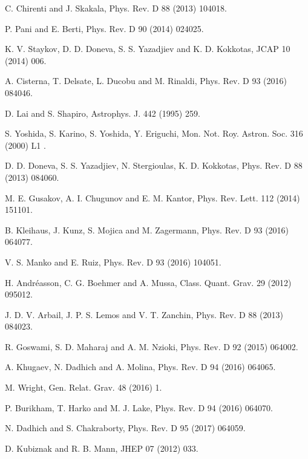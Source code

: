 \documentclass[aps]{revtex4}
\begin{document}
\begin{thebibliography}{999}
 C. Chirenti and J. Skakala, Phys. Rev. D 88 (2013) 104018.

 P. Pani and E. Berti, Phys. Rev. D 90 (2014) 024025.

 K. V. Staykov, D. D. Doneva, S. S. Yazadjiev and K. D.
Kokkotas, JCAP 10 (2014) 006.

 A. Cisterna, T. Delsate, L. Ducobu and M. Rinaldi, Phys.
Rev. D 93 (2016) 084046.

 D. Lai and S. Shapiro, Astrophys. J. 442 (1995) 259.

 S. Yoshida, S. Karino, S. Yoshida, Y. Eriguchi, Mon. Not.
Roy. Astron. Soc. 316 (2000) L1 .

 D. D. Doneva, S. S. Yazadjiev, N. Stergioulas, K. D.
Kokkotas, Phys. Rev. D 88 (2013) 084060.

 M. E. Gusakov, A. I. Chugunov and E. M. Kantor, Phys. Rev.
Lett. 112 (2014) 151101.

 B. Kleihaus, J. Kunz, S. Mojica and M. Zagermann, Phys.
Rev. D 93 (2016) 064077.

 V. S. Manko and E. Ruiz, Phys. Rev. D 93 (2016) 104051.

 H. Andr\'{e}asson, C. G. Boehmer and A. Mussa, Class. Quant.
Grav. 29 (2012) 095012.

 J. D. V. Arbail, J. P. S. Lemos and V. T. Zanchin, Phys.
Rev. D 88 (2013) 084023.

 R. Goswami, S. D. Maharaj and A. M. Nzioki, Phys. Rev. D
92 (2015) 064002.

 A. Khugaev, N. Dadhich and A. Molina, Phys. Rev. D 94
(2016) 064065.

 M. Wright, Gen. Relat. Grav. 48 (2016) 1.

 P. Burikham, T. Harko and M. J. Lake, Phys. Rev. D 94 (2016) 064070.

 N. Dadhich and S. Chakraborty, Phys. Rev. D 95 (2017) 064059.

 D. Kubiznak and R. B. Mann, JHEP 07 (2012) 033.
\end{thebibliography}


\end{document}
